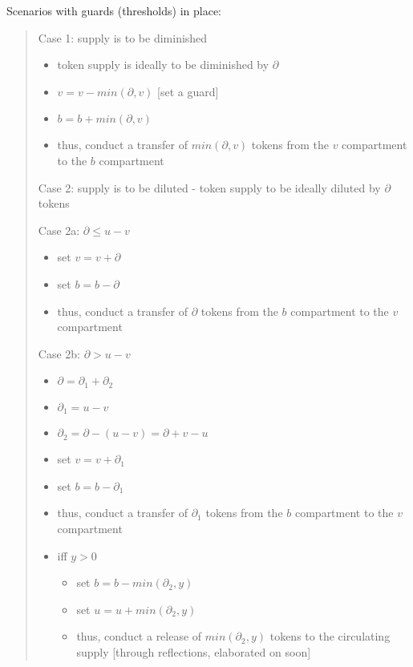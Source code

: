 \documentclass[letterpaper,11pt]{article}
\begin{document}
\vspace{0.15cm}

\noindent Scenarios with guards (thresholds) in place:
\begin{quote}
    Case 1: supply is to be diminished
    \begin{itemize}
        \item token supply is ideally to be diminished by $\partial$
    	\item $v = v - min(\partial, v)$ [set a guard]
     	 \item $b = b + min(\partial, v)$
    	\item thus, conduct a transfer of $min(\partial, v)$ tokens
     	 from the $v$ compartment to the $b$ compartment
    \end{itemize}


	Case 2: supply is to be diluted - token supply to be ideally diluted by $\partial$ tokens

    Case 2a: $\partial \leq u-v$
    
    \begin{itemize}
        \item set $v=v+\partial$
        \item set $b=b-\partial$
        \item thus, conduct a transfer of $\partial$ tokens from the $b$ compartment to the $v$ compartment 
    \end{itemize}
    
    Case 2b: $\partial > u-v$
    
    \begin{itemize}
        \item $\partial=\partial_{1}+\partial_{2}$
        \item $\partial_1=u-v$
        \item $\partial_2=\partial-(u-v)=\partial+v-u$
        \item set $v=v+\partial_1$
        \item set $b=b-\partial_1$
        \item thus, conduct a transfer of $\partial_1$ tokens from the $b$ compartment to the $v$ compartment
        \item iff $ y > 0$
        \begin{itemize}
            \item set $b=b-min(\partial_2,y)$
            \item set $u=u+min(\partial_2,y)$
            \item thus, conduct a release of $min(\partial_2,y)$ tokens to the circulating supply [through reflections, elaborated on soon]
        \end{itemize}
    \end{itemize}

\end{quote}
\end{document}
